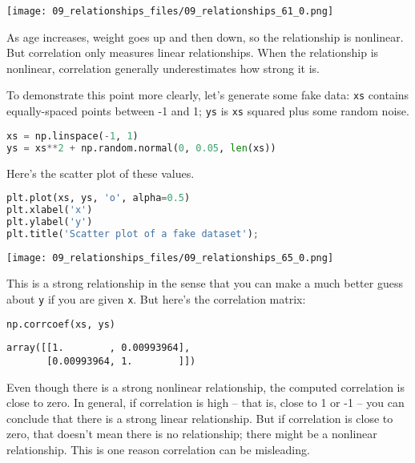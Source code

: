 \begin{center}
\texttt{[image: 09\_relationships\_files/09\_relationships\_61\_0.png]}
\end{center}

As age increases, weight goes up and then down, so the relationship is
nonlinear. But correlation only measures linear relationships. When the
relationship is nonlinear, correlation generally underestimates how
strong it is.

To demonstrate this point more clearly, let's generate some fake data:
\passthrough{\lstinline!xs!} contains equally-spaced points between -1
and 1; \passthrough{\lstinline!ys!} is \passthrough{\lstinline!xs!}
squared plus some random noise.

\begin{lstlisting}[language=Python,style=source]
xs = np.linspace(-1, 1)
ys = xs**2 + np.random.normal(0, 0.05, len(xs))
\end{lstlisting}

\pagebreak

Here's the scatter plot of these values.

\begin{lstlisting}[language=Python,style=source]
plt.plot(xs, ys, 'o', alpha=0.5)
plt.xlabel('x')
plt.ylabel('y')
plt.title('Scatter plot of a fake dataset');
\end{lstlisting}

\begin{center}
\texttt{[image: 09\_relationships\_files/09\_relationships\_65\_0.png]}
\end{center}

This is a strong relationship in the sense that you can make a much
better guess about \passthrough{\lstinline!y!} if you are given
\passthrough{\lstinline!x!}. But here's the correlation matrix:

\begin{lstlisting}[language=Python,style=source]
np.corrcoef(xs, ys)
\end{lstlisting}

\begin{lstlisting}[style=output]
array([[1.        , 0.00993964],
       [0.00993964, 1.        ]])
\end{lstlisting}

Even though there is a strong nonlinear relationship, the computed
correlation is close to zero. In general, if correlation is high -- that
is, close to 1 or -1 -- you can conclude that there is a strong linear
relationship. But if correlation is close to zero, that doesn't mean
there is no relationship; there might be a nonlinear relationship. This
is one reason correlation can be misleading.

